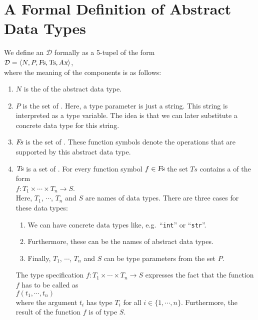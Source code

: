 \section[Formal Definition]{A Formal Definition of Abstract Data Types}
We define an  $\mathcal{D}$ formally as a 5-tupel of the form
\\[0.2cm]
\hspace*{1.3cm}
 $\mathcal{D} = \langle N, P, \textsl{Fs}, \textsl{Ts}, \textsl{Ax} \rangle$,
\\[0.2cm] 
where the meaning of the components is as follows:
\begin{enumerate}
\item $N$ is the  of the abstract data type.
\item $P$ is the set of .   Here, a type parameter is just a string.
      This string is interpreted as a type variable.  The idea is that we can later substitute 
      a concrete data type for this string.
\item $\textsl{Fs}$ is the set of .  These function symbols denote the 
      operations that are supported by this abstract data type.
\item $\textsl{Ts}$ is a set of .  For every function symbol
      $f \in \textsl{Fs}$
      the set $Ts$ contains a  of the form 
      \\[0.2cm]
      \hspace*{1.3cm} 
      $f: T_1 \times \cdots \times T_n \rightarrow S$. 
      \\[0.2cm]
      Here,  $T_1$, $\cdots$, $T_n$ and $S$ are names of data types.  There are three cases for
      these data types: 
      \begin{enumerate}
      \item We can have concrete data types like, e.g.~``\texttt{int}'' or ``\texttt{str}''.
      \item Furthermore, these can be the names of abstract data types.
      \item Finally,  $T_1$, $\cdots$, $T_n$ and $S$ can be type parameters from the set $P$.
      \end{enumerate}
      The type specification $f: T_1 \times \cdots \times T_n \rightarrow S$ expresses the fact that
      the function $f$ has to be called as \\[0.2cm] 
      \hspace*{1.3cm}
      $f(t_1,\cdots,t_n)$ 
      \\[0.2cm]
      where the argument $t_i$ has type $T_i$ for all $i \in \{1,\cdots,n\}$.
      Furthermore, the result of the function $f$ is of type $S$.


\end{enumerate}
